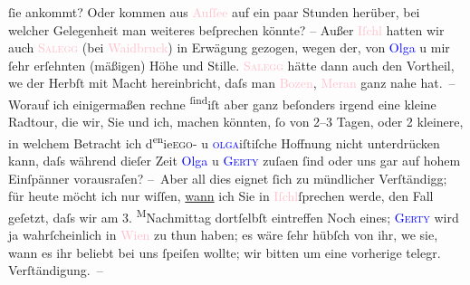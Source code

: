                ſie ankommt? Oder kommen aus \textcolor{pink}{Auſſee}{}\ledrightnote{\textcolor{pink}{Bad Aussee}} auf ein paar
               Stunden herüber, bei welcher Gelegenheit man weiteres beſprechen könnte? – Außer \textcolor{pink}{Iſchl}{}\ledrightnote{\textcolor{pink}{Bad Ischl}} hatten wir auch \textcolor{pink}{\textsc{Salegg}}{}\ledrightnote{\textcolor{pink}{Burg Salegg}} (bei \textcolor{pink}{Waidbruck}{}\ledrightnote{\textcolor{pink}{Ponte Gardena}}) in {\pb}Erwägung gezogen, wegen der, von \textcolor{blue}{Olga}{}\ledrightnote{\textcolor{blue}{Olga Schnitzler}} u mir ſehr erſehnten (mäßigen) Höhe und Stille. \textcolor{pink}{\textsc{Salegg}}{}\ledrightnote{\textcolor{pink}{Burg Salegg}} hätte dann auch den Vortheil, we{\geminationn} der
                  Herbſt mit Macht hereinbricht, daſs man \textcolor{pink}{Bozen}{}\ledrightnote{\textcolor{pink}{Bozen}}, \textcolor{pink}{Meran}{}\ledrightnote{\textcolor{pink}{Meran}} ganz nahe hat. –\pend
           \pstart
           Worauf ich einigermaßen rechne \substVorne{}\textsuperscript{ſind}\substDazwischen{}iſt\substHinten{} aber ganz beſonders irgend eine kleine Radtour, die wir, Sie und ich, machen
               könnten, ſo von 2–3 Tagen, oder 2 kleinere, {\pb}in welchem
               Betracht ich d\substVorne{}\textsuperscript{en}\substDazwischen{}ie\substHinten{}{ }\textsc{ego}- u \textcolor{blue}{\textsc{olga}}{}\ledrightnote{\textcolor{blue}{Olga Schnitzler}}iſtiſche Hoffnung nicht unterdrücken kann, daſs während dieſer Zeit \textcolor{blue}{Olga}{}\ledrightnote{\textcolor{blue}{Olga Schnitzler}} u \textcolor{blue}{\textsc{Gerty}}{}\ledrightnote{\textcolor{blue}{Gertrude von Hofmannsthal}} zuſa{\geminationm}en ſind oder uns gar auf hohem Einſpänner
               vorausraſen?\pend
           \pstart
           – Aber all dies eignet ſich zu mündlicher Verſtändigg; für heute möcht ich nur
               wiſſen, \uline{wann} ich Sie in \textcolor{pink}{Iſchl}{}\ledrightnote{\textcolor{pink}{Bad Ischl}}{ }ſprechen werde, den Fall geſetzt, daſs wir am
                  3.{ }\substVorne{}\textsuperscript{M}\substDazwischen{}Na\substHinten{}chmittag dortſelbſt eintreffen\pend
           \pstart
           {\pb}Noch eines; \textcolor{blue}{\textsc{Gerty}}{}\ledrightnote{\textcolor{blue}{Gertrude von Hofmannsthal}} wird ja wahrſcheinlich in \textcolor{pink}{Wien}{}\ledrightnote{\textcolor{pink}{Wien}} zu thun haben;
               es wäre ſehr hübſch von ihr, we{\geminationn}{ }sie, wann es ihr beliebt bei uns ſpeiſen wollte;
               wir bitten um eine vorherige telegr. Verſtändigung. –\pend
